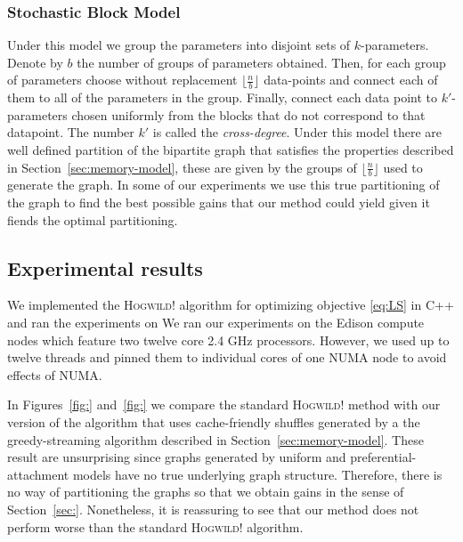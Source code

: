 \documentclass[times,11pt]{article}
\numberwithin{equation}{section}		%
\numberwithin{figure}{section}			%
\numberwithin{table}{section}				%
\newcommand{\HW}{\textsc{Hogwild!}}
\begin{document}
\subsubsection*{Stochastic Block Model}

Under this model we group the parameters into disjoint sets of $k$-parameters. Denote by $b$ the number of groups of parameters obtained. Then, for each group of parameters choose without replacement $\lfloor \frac{n}{b}\rfloor$ data-points and connect each of them to all of the parameters in the group. Finally, connect each data point to $k'$-parameters chosen uniformly from the blocks that do not correspond to that datapoint. The number $k'$ is called the \emph{cross-degree}. Under this model there are well defined partition of the bipartite graph that satisfies the properties described in Section~\ref{sec:memory-model}, these are given by the groups of $\lfloor \frac{n}{b}\rfloor$ used to generate the graph. In some of our experiments we use this true partitioning of the graph to find the best possible gains that our method could yield given it fiends the optimal partitioning.
   

\subsection{Experimental results}

We implemented the \HW{} algorithm for optimizing objective \eqref{eq:LS} in C++ and ran the experiments on 
We ran our experiments on the Edison compute nodes which feature two twelve core 2.4 GHz processors. 
However, we used up to twelve threads and pinned them to individual cores of one NUMA node to avoid effects of NUMA.

In Figures~\ref{fig:} and~\ref{fig:} we compare the standard \HW{} method with our version of the algorithm that uses cache-friendly shuffles generated by a the greedy-streaming algorithm described in Section~\ref{sec:memory-model}. These result are unsurprising since graphs generated by uniform and preferential-attachment models have no true underlying graph structure. Therefore, there is no way of partitioning the graphs so that we obtain gains in the sense of Section~\ref{sec:}. Nonetheless, it is reassuring to see that our method does not perform worse than the standard \HW{} algorithm. 
\end{document}
